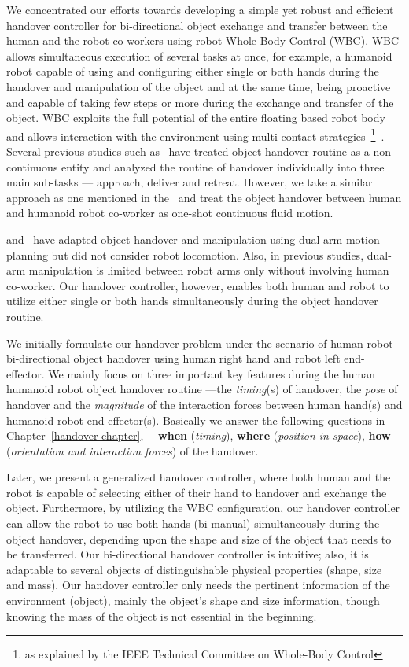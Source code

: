 We concentrated our efforts towards developing a simple yet robust and efficient handover controller for bi-directional object exchange and transfer between the human and the robot co-workers using robot Whole-Body Control (WBC). WBC allows simultaneous execution of several tasks at once, for example, a humanoid robot capable of using and configuring either single or both hands during the handover and manipulation of the object and at the same time, being proactive and capable of taking few steps or more during the exchange and transfer of the object. WBC exploits the full potential of the entire floating based robot body and allows interaction with the environment using multi-contact strategies~\footnote{as explained by the IEEE Technical Committee on Whole-Body Control}~\cite{ladder-HRP-2Kai}. Several previous studies such as~\cite{strabala2013toward, huber2008human} have treated object handover routine as a non-continuous entity and analyzed the routine of handover individually into three main sub-tasks — approach, deliver and retreat. However, we take a similar approach as one mentioned in the~\cite{medina2016human, nemlekarprompt} and treat the object handover between human and humanoid robot co-worker as one-shot continuous fluid motion.

\cite{vahrenkamp2009humanoid, vezzani2017novel} and~\cite{kim2004advanced} have adapted object handover and manipulation using dual-arm motion planning but did not consider robot locomotion. Also, in previous studies, dual-arm manipulation is limited between robot arms only without involving human co-worker. Our handover controller, however, enables both human and robot to utilize either single or both hands simultaneously during the object handover routine.

We initially formulate our handover problem under the scenario of human-robot bi-directional object handover using human right hand and robot left end-effector. We mainly focus on three important key features during the human humanoid robot object handover routine ---the \textit{timing}(s) of handover, the \textit{pose} of handover and the \textit{magnitude} of the interaction forces between human hand(s) and humanoid robot end-effector(s). Basically we answer the following questions in Chapter~\ref{handover chapter}, ---\textbf{when} (\textit{timing}), \textbf{where} (\textit{position in space}), \textbf{how} (\textit{orientation and interaction forces}) of the handover.


Later, we present a generalized handover controller, where both human and the robot is capable of selecting either of their hand to handover and exchange the object. Furthermore, by utilizing the WBC configuration, our handover controller can allow the robot to use both hands (bi-manual) simultaneously during the object handover, depending upon the shape and size of the object that needs to be transferred. Our bi-directional handover controller is intuitive; also, it is adaptable to several objects of distinguishable physical properties (shape, size and mass). Our handover controller only needs the pertinent information of the environment (object), mainly the object's shape and size information, though knowing the mass of the object is not essential in the beginning.

